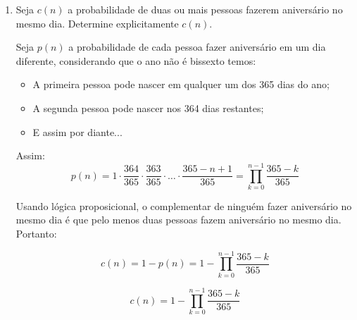 \documentclass[12 pt]{article}
\begin{document}
\begin{enumerate}
    \item Seja $c(n)$ a probabilidade de duas ou mais pessoas fazerem aniversário no mesmo dia. Determine explicitamente $c(n)$.
    \begin{tcolorbox}[colframe=black, title=Resposta:]
        Seja $p(n)$ a probabilidade de cada pessoa fazer aniversário em um dia diferente, considerando que o ano não é bissexto temos:
        \begin{itemize}
            \item A primeira pessoa pode nascer em qualquer um dos 365 dias do ano;
            \item A segunda pessoa pode nascer nos 364 dias restantes;
            \item E assim por diante...
        \end{itemize}

        Assim:
        $$p(n) = 1 \cdot \frac{364}{365} \cdot \frac{363}{365} \cdot \dots \cdot \frac{365-n+1}{365} = \prod _{k=0}^{n-1} \frac{365-k}{365}$$

        Usando lógica proposicional, o complementar de ninguém fazer aniversário no mesmo dia é que pelo menos duas pessoas fazem aniversário no mesmo dia. Portanto:	
        
        $$c(n) = 1 - p(n) = 1 - \prod _{k=0}^{n-1} \frac{365-k}{365}$$

        $$\boxed{c(n) = 1 - \prod _{k=0}^{n-1} \frac{365-k}{365}}$$


\end{tcolorbox}
\end{enumerate}
\end{document}
